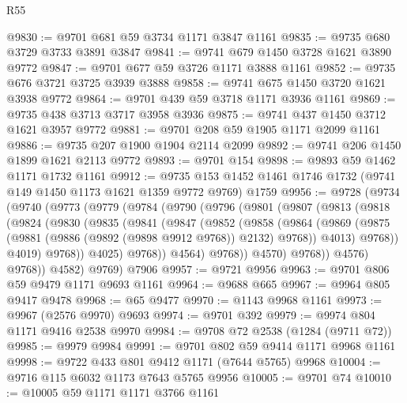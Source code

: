 \begin{lexlean}{R55}
\begin{coremodule}
@9830 := @9701 @681 @59 @3734 @1171 @3847 @1161
@9835 := @9735 @680 @3729 @3733 @3891 @3847
@9841 := @9741 @679 @1450 @3728 @1621 @3890 @9772
@9847 := @9701 @677 @59 @3726 @1171 @3888 @1161
@9852 := @9735 @676 @3721 @3725 @3939 @3888
@9858 := @9741 @675 @1450 @3720 @1621 @3938 @9772
@9864 := @9701 @439 @59 @3718 @1171 @3936 @1161
@9869 := @9735 @438 @3713 @3717 @3958 @3936
@9875 := @9741 @437 @1450 @3712 @1621 @3957 @9772
@9881 := @9701 @208 @59 @1905 @1171 @2099 @1161
@9886 := @9735 @207 @1900 @1904 @2114 @2099
@9892 := @9741 @206 @1450 @1899 @1621 @2113 @9772
@9893 := @9701 @154
@9898 := @9893 @59 @1462 @1171 @1732 @1161
@9912 := @9735 @153 @1452 @1461 @1746 @1732 (@9741 @149 @1450 @1173 @1621 @1359 @9772 @9769) @1759
@9956 := @9728
    (@9734
      (@9740
        (@9773
          (@9779
            (@9784
              (@9790
                (@9796
                  (@9801
                    (@9807
                      (@9813
                        (@9818
                          (@9824
                            (@9830
                              (@9835
                                (@9841
                                  (@9847
                                    (@9852
                                      (@9858
                                        (@9864
                                          (@9869
                                            (@9875
                                              (@9881
                                                (@9886 (@9892 (@9898 @9912 @9768)) @2132)
                                                @9768))
                                            @4013)
                                          @9768))
                                      @4019)
                                    @9768))
                                @4025)
                              @9768))
                          @4564)
                        @9768))
                    @4570)
                  @9768))
              @4576)
            @9768))
        @4582)
      @9769)
    @7906
@9957 := @9721 @9956
@9963 := @9701 @806 @59 @9479 @1171 @9693 @1161
@9964 := @9688 @665
@9967 := @9964 @805 @9417 @9478
@9968 := @65 @9477
@9970 := @1143 @9968 @1161
@9973 := @9967 (@2576 @9970) @9693
@9974 := @9701 @392
@9979 := @9974 @804 @1171 @9416 @2538 @9970
@9984 := @9708 @72 @2538 (@1284 (@9711 @72))
@9985 := @9979 @9984
@9991 := @9701 @802 @59 @9414 @1171 @9968 @1161
@9998 := @9722 @433 @801 @9412 @1171 (@7644 @5765) @9968
@10004 := @9716 @115 @6032 @1173 @7643 @5765 @9956
@10005 := @9701 @74
@10010 := @10005 @59 @1171 @1171 @3766 @1161

\end{coremodule}
\end{lexlean}
